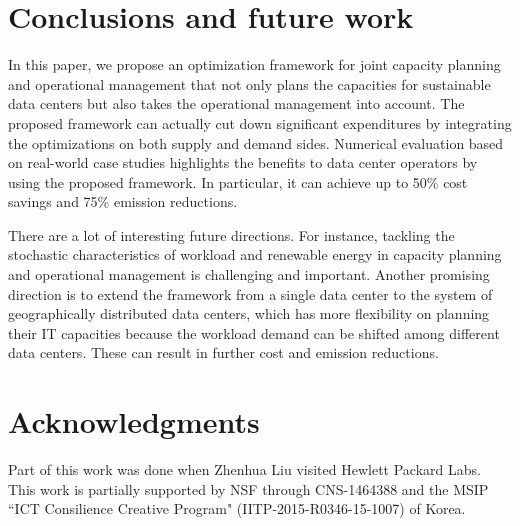 \section{Conclusions and future work}

In this paper, we propose an optimization framework for joint capacity planning and operational management that not only plans the capacities for sustainable data centers but also takes the operational management into account. The proposed framework can actually cut down significant expenditures by integrating the optimizations on both supply and demand sides. 
Numerical evaluation based on real-world case studies highlights the benefits to data center operators by using the proposed framework. In particular, it can achieve up to 50\% cost savings and 75\% emission reductions. 

There are a lot of interesting future directions. For instance, tackling the stochastic characteristics of workload and renewable energy in capacity planning and operational management is challenging and important. Another promising direction is to extend the framework from a single data center to the system of geographically distributed data centers, which has more flexibility on planning their IT capacities because the workload demand can be shifted among different data centers. These can result in further cost and emission reductions.

\section*{Acknowledgments}

Part of this work  was done when Zhenhua Liu visited Hewlett Packard Labs. This work is partially supported by NSF through CNS-1464388 and the MSIP ``ICT Consilience Creative Program" (IITP-2015-R0346-15-1007) of Korea.
